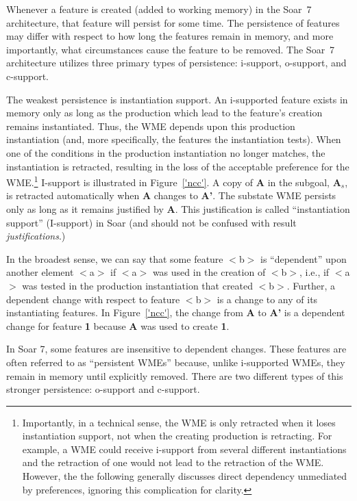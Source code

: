 Whenever a feature is created (added to working memory) in the Soar~7
architecture, that feature will persist for some time.  The
persistence of features may differ with respect to how long the
features remain in memory, and more importantly, what circumstances
cause the feature to be removed.  The Soar~7 architecture utilizes
three primary types of persistence: i-support, o-support, and
c-support.

The weakest persistence is instantiation support.  An i-supported
feature exists in memory only as long as the production which lead to
the feature's creation remains instantiated.  Thus, the WME depends
upon this production instantiation (and, more specifically, the
features the instantiation tests).  When one of the conditions in the
production instantiation no longer matches, the instantiation is
retracted, resulting in the loss of the acceptable preference for the
WME.\footnote{Importantly, in a technical sense, the WME is only
retracted when it loses instantiation support, not when the creating
production is retracting.  For example, a WME could receive i-support
from several different instantiations and the retraction of one would
not lead to the retraction of the WME.  However, the the following
generally discusses direct dependency unmediated by preferences,
ignoring this complication for clarity.}  I-support is illustrated in
Figure~\ref{'ncc'}. A copy of {\bf A} in the subgoal, {\bf A$_s$}, is
retracted automatically when {\bf A} changes to {\bf A'}.  The
substate WME persists only as long as it remains justified by {\bf A}.
This justification is called ``instantiation support'' (I-support) in
Soar (and should not be confused with result \emph{justifications}.)

In the broadest sense, we can say that some feature $<$b$>$ is
``dependent'' upon another element $<$a$>$ if $<$a$>$ was used in the
creation of $<$b$>$, i.e., if $<$a$>$ was tested in the production
instantiation that created $<$b$>$.  Further, a dependent change with
respect to feature $<$b$>$ is a change to any of its instantiating
features.  In Figure~\ref{'ncc'}, the change from {\bf A} to {\bf A'}
is a dependent change for feature {\bf 1} because {\bf A} was used to
create {\bf 1}.

In Soar 7, some features are insensitive to dependent changes.  These
features are often referred to as ``persistent WMEs'' because, unlike
i-supported WMEs, they remain in memory until explicitly removed.
There are two different types of this stronger persistence: o-support
and c-support.  

